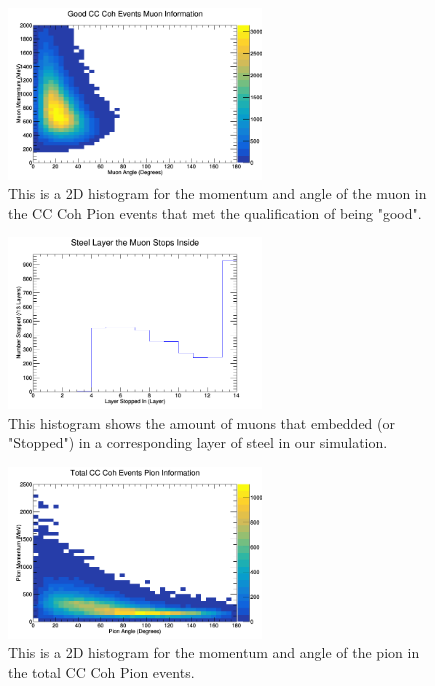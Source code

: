 \documentclass[11pt]{article}
\begin{document}
\begin{figure}[H]
\centering
\includegraphics[width=0.6\textwidth]{NewANMBergerSehgalImages/6-GoodCCCohMuonInfoANMBS.png}
\caption{This is a 2D histogram for the momentum and angle of the muon in the CC Coh Pion events that met the qualification of being "good".}
\end{figure}

\begin{figure}[H]
\centering
\includegraphics[width=0.6\textwidth]{NewANMBergerSehgalImages/7-LayerPenetrationANMBS.png}
\caption{This histogram shows the amount of muons that embedded (or "Stopped") in a corresponding layer of steel in our simulation.}
\end{figure}

\begin{figure}[H]
\centering
\includegraphics[width=0.6\textwidth]{NewANMBergerSehgalImages/8-TotalCCCohPionInfoANMBS.png}
\caption{This is a 2D histogram for the momentum and angle of the pion in the total CC Coh Pion events.}
\end{figure}
\end{document}
